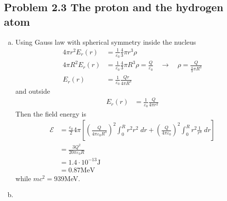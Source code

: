 \documentclass[10pt,a4paper]{book}
\theoremstyle{definition}
\begin{document}
\subsection{Problem 2.3 The proton and the hydrogen atom}
\begin{enumerate}[(a)]
\item Using Gauss law with spherical symmetry inside the nucleus
\begin{align}
4\pi r^2 E_r(r)&=\frac{1}{\varepsilon_0}\frac{4}{3}\pi r^3\rho\\
4\pi R^2 E_r(r)&=\frac{1}{\varepsilon_0}\frac{4}{3}\pi R^3\rho=\frac{Q}{\varepsilon_0}\quad\rightarrow\quad\rho=\frac{Q}{\frac{4}{3}\pi R^3}\\
E_r(r)&=\frac{1}{\varepsilon_0}\frac{Qr}{4\pi R^3}
\end{align}
and outside
\begin{align}
E_r(r)&=\frac{1}{\varepsilon_0}\frac{Q}{4\pi r^2}
\end{align}
Then the field energy is
\begin{align}
\mathscr{E}
&=\frac{\varepsilon_0}{2}4\pi\left[\left(\frac{Q}{4\pi\varepsilon_0 R^3}\right)^2\int_0^Rr^2r^2\;dr+\left(\frac{Q}{4\pi\varepsilon_0}\right)^2\int_0^Rr^2\frac{1}{r^4}\;dr\right]\\
&=\frac{3Q^2}{20\pi\varepsilon_0 R}\\
&=1.4\cdot 10^{-13}\text{J}\\
&=0.87\text{MeV}
\end{align}
while $mc^2=939$MeV.
\item

\end{enumerate}
\end{document}
